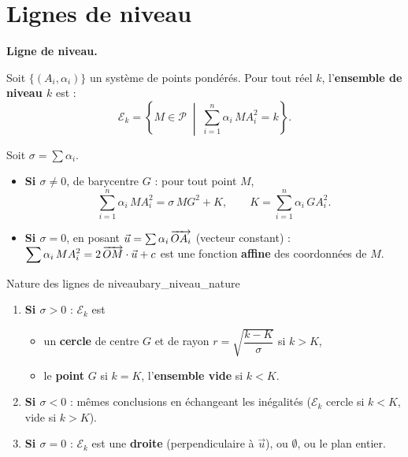\section{Lignes de niveau}

\begin{definition}
	\textbf{Ligne de niveau.}\par
	Soit $\{(A_i, \alpha_i)\}$ un système de points pondérés. Pour tout réel $k$,
	l'\textbf{ensemble de niveau $k$} est :
	$$
	\mathscr{E}_k = \left\{ M \in \mathscr{P} \;\middle|\;
	\sum_{i=1}^{n} \alpha_i\,MA_i^2 = k \right\}.
	$$
\end{definition}

\begin{theoreme}
	Soit $\sigma = \sum \alpha_i$.
	\begin{itemize}[label=\textbullet]
		\item \textbf{Si $\sigma \neq 0$}, de barycentre $G$ : pour tout point $M$,
		$$
		\sum_{i=1}^{n} \alpha_i\,MA_i^2 = \sigma\,MG^2 + K,
		\qquad K = \sum_{i=1}^{n} \alpha_i\,GA_i^2 .
		$$
		\item \textbf{Si $\sigma = 0$}, en posant $\vec{u} = \sum \alpha_i\,\overrightarrow{OA_i}$
		(vecteur constant) : $\displaystyle\sum \alpha_i\,MA_i^2 = 2\,\overrightarrow{OM}\cdot\vec{u} + c$
		est une fonction \textbf{affine} des coordonnées de $M$.
	\end{itemize}
\end{theoreme}

\begin{propriete}{Nature des lignes de niveau}{bary_niveau_nature}
	\begin{enumerate}
		\item \textbf{Si $\sigma > 0$} : $\mathscr{E}_k$ est
		\begin{itemize}[label=\textbullet]
			\item un \textbf{cercle} de centre $G$ et de rayon $r = \sqrt{\dfrac{k-K}{\sigma}}$
			si $k > K$,
			\item le \textbf{point} $G$ si $k = K$, \quad l'\textbf{ensemble vide} si $k < K$.
		\end{itemize}
		\item \textbf{Si $\sigma < 0$} : mêmes conclusions en échangeant les
		inégalités ($\mathscr{E}_k$ cercle si $k < K$, vide si $k > K$).
		\item \textbf{Si $\sigma = 0$} : $\mathscr{E}_k$ est une \textbf{droite}
		(perpendiculaire à $\vec u$), ou $\emptyset$, ou le plan entier.
	\end{enumerate}
\end{propriete}

